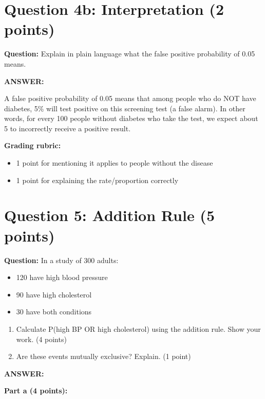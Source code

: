 \documentclass[11pt]{article}
\begin{document}
\vspace{0.3cm}
\noindent\hrulefill

\section*{Question 4b: Interpretation (2 points)}

\textbf{Question:} Explain in plain language what the false positive probability of 0.05 means.

\textbf{ANSWER:}

A false positive probability of 0.05 means that among people who do NOT have diabetes, 5\% will test positive on this screening test (a false alarm). In other words, for every 100 people without diabetes who take the test, we expect about 5 to incorrectly receive a positive result.

\textbf{Grading rubric:}
\begin{itemize}
    \item 1 point for mentioning it applies to people without the disease
    \item 1 point for explaining the rate/proportion correctly
\end{itemize}

\vspace{0.3cm}
\noindent\hrulefill

\section*{Question 5: Addition Rule (5 points)}

\textbf{Question:} In a study of 300 adults:
\begin{itemize}
    \item 120 have high blood pressure
    \item 90 have high cholesterol
    \item 30 have both conditions
\end{itemize}

\begin{enumerate}
    \item[a)] Calculate P(high BP OR high cholesterol) using the addition rule. Show your work. (4 points)
    \item[b)] Are these events mutually exclusive? Explain. (1 point)
\end{enumerate}

\textbf{ANSWER:}

\textbf{Part a (4 points):}
\end{document}

